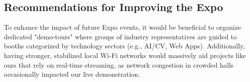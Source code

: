 \subsection{Recommendations for Improving the Expo}
To enhance the impact of future Expo events, it would be beneficial to organize dedicated "demo-tours" where groups of industry representatives are guided to booths categorized by technology sectors (e.g., AI/CV, Web Apps). Additionally, having stronger, stabilized local Wi-Fi networks would massively aid projects like ours that rely on real-time streaming, as network congestion in crowded halls occasionally impacted our live demonstration.